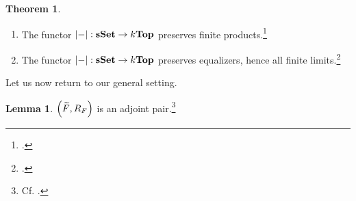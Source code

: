 \documentclass[10pt,letterpaper,cm]{nupset}
\theoremstyle{definition}
\theoremstyle{theorem}
\newtheorem{theorem}[definition]{Theorem}
\newtheorem{lemma}[definition]{Lemma}
\theoremstyle{remark}
\newcommand{\0}{\mathbf{0}}
\newcommand{\1}{\mathbf{1}}
\newcommand{\2}{\mathbf{2}}
\DeclareMathOperator{\sset}{\mathbf{sSet}}
\newcommand{\be}{\begin{enumerate}}
\newcommand{\ee}{\end{enumerate}}
\begin{document}
\begin{theorem}\label{realpres} $ $
\be[label=(\arabic*)]
\item The functor $\mleft\lvert{-}\mright\rvert : \sset \to k\mathbf{Top}$ preserves finite products.\footnote{\cite[Lemma 3.1.8]{Hovey}.}
\item The functor $\mleft\lvert{-}\mright\rvert : \sset \to k\mathbf{Top}$ preserves equalizers, hence all finite limits.\footnote{\cite[Lemma 3.2.4]{Hovey}.}
\ee
\end{theorem}

\medskip

Let us now return to our general setting.

\begin{lemma}
$\mleft(\widetilde{F}, R_F\mright)$ is an adjoint pair.\footnote{Cf.  \cite[Section 4]{Riehl}.}
\end{lemma}
\end{document}
